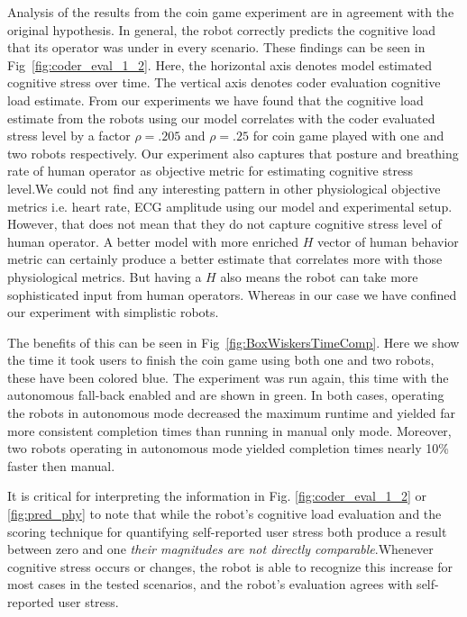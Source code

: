 \documentclass{sig-alternate}
\begin{document}
Analysis of the results from the coin game experiment are in agreement
with the original hypothesis. In general, the robot correctly predicts
the cognitive load that its operator was under in every
scenario. These findings can be seen in Fig~\ref{fig:coder_eval_1_2}.
Here, the horizontal axis denotes model estimated cognitive stress over time. The vertical axis denotes coder evaluation cognitive load estimate. From our experiments we have found that the cognitive load estimate from the robots using our model correlates with the coder evaluated stress level by a factor $\rho=.205$ and $\rho=.25$ for coin game played with one and two robots respectively. Our experiment also captures that posture and breathing rate of human operator as objective metric for estimating cognitive stress level.We could not find any interesting pattern in other physiological objective metrics i.e. heart rate, ECG amplitude using our model and experimental setup. However, that does not mean that they do not capture cognitive stress level of human operator. A better model with more enriched $H$ vector of human behavior metric can certainly produce a better estimate that correlates more with those physiological metrics. But having a $H$ also means the robot can take more sophisticated input from human operators. Whereas in our case we have confined our experiment with simplistic robots.

The benefits of this can be seen in Fig~\ref{fig:BoxWiskersTimeComp}. Here we show the time it took users to finish the coin game using both one and two robots, these have been colored blue. The experiment was run again, this time
with the autonomous fall-back enabled and are shown in green. In both cases,
operating the robots in autonomous mode decreased the maximum runtime and yielded far more consistent completion times than running in manual only mode. Moreover, two robots operating in autonomous mode yielded completion times nearly 10\% faster then manual.

It is critical for interpreting the information in Fig. \ref{fig:coder_eval_1_2} or \ref{fig:pred_phy} to note that while the robot's cognitive load evaluation and the scoring technique for quantifying
self-reported user stress both produce a result between zero and one
\textit{their magnitudes are not directly comparable}.Whenever cognitive stress occurs or changes, the robot is able to recognize this increase for most cases in the
tested scenarios, and the robot's evaluation agrees with self-reported user stress.
\end{document}
